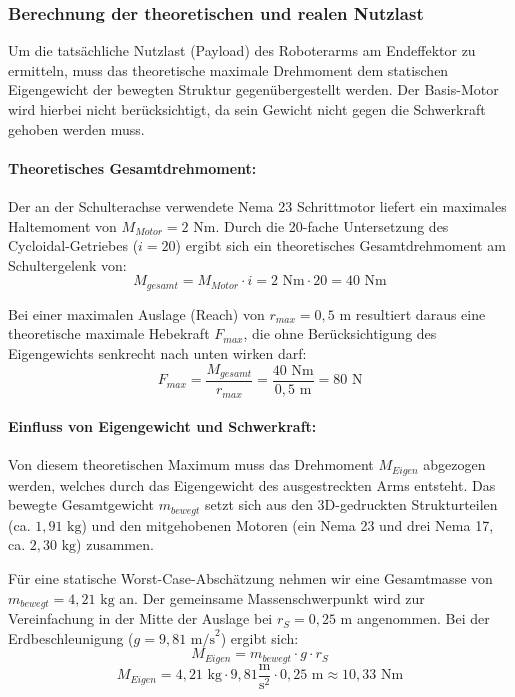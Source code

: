\subsubsection*{Berechnung der theoretischen und realen Nutzlast}
Um die tatsächliche Nutzlast (Payload) des Roboterarms am Endeffektor zu ermitteln, muss das theoretische maximale Drehmoment dem statischen Eigengewicht der bewegten Struktur gegenübergestellt werden. Der Basis-Motor wird hierbei nicht berücksichtigt, da sein Gewicht nicht gegen die Schwerkraft gehoben werden muss.

\paragraph{Theoretisches Gesamtdrehmoment:}
Der an der Schulterachse verwendete Nema 23 Schrittmotor liefert ein maximales Haltemoment von $M_{Motor} = 2\text{ Nm}$. Durch die 20-fache Untersetzung des Cycloidal-Getriebes ($i = 20$) ergibt sich ein theoretisches Gesamtdrehmoment am Schultergelenk von:
$$M_{gesamt} = M_{Motor} \cdot i = 2\text{ Nm} \cdot 20 = 40\text{ Nm}$$

Bei einer maximalen Auslage (Reach) von $r_{max} = 0,5\text{ m}$ resultiert daraus eine theoretische maximale Hebekraft $F_{max}$, die ohne Berücksichtigung des Eigengewichts senkrecht nach unten wirken darf:
$$F_{max} = \frac{M_{gesamt}}{r_{max}} = \frac{40\text{ Nm}}{0,5\text{ m}} = 80\text{ N}$$

\paragraph{Einfluss von Eigengewicht und Schwerkraft:}
Von diesem theoretischen Maximum muss das Drehmoment $M_{Eigen}$ abgezogen werden, welches durch das Eigengewicht des ausgestreckten Arms entsteht. Das bewegte Gesamtgewicht $m_{bewegt}$ setzt sich aus den 3D-gedruckten Strukturteilen (ca. $1,91\text{ kg}$) und den mitgehobenen Motoren (ein Nema 23 und drei Nema 17, ca. $2,30\text{ kg}$) zusammen.

Für eine statische Worst-Case-Abschätzung nehmen wir eine Gesamtmasse von $m_{bewegt} = 4,21\text{ kg}$ an. Der gemeinsame Massenschwerpunkt wird zur Vereinfachung in der Mitte der Auslage bei $r_{S} = 0,25\text{ m}$ angenommen. Bei der Erdbeschleunigung ($g = 9,81\text{ m/s}^2$) ergibt sich:
$$M_{Eigen} = m_{bewegt} \cdot g \cdot r_{S}$$
$$M_{Eigen} = 4,21\text{ kg} \cdot 9,81\frac{\text{m}}{\text{s}^2} \cdot 0,25\text{ m} \approx 10,33\text{ Nm}$$

